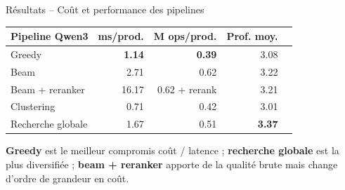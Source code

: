 \documentclass[11pt,aspectratio=169]{beamer}
\begin{document}
\begin{frame}{Résultats -- Coût et performance des pipelines}
\small
\begin{table}
\centering
\renewcommand{\arraystretch}{1.15}
\begin{tabular}{lrrrr}
\toprule
\textbf{Pipeline Qwen3} & \textbf{ms/prod.} & \textbf{M ops/prod.} & \textbf{Prof. moy.} \\
\midrule
Greedy & \textbf{1.14} & \textbf{0.39} & 3.08  \\
Beam & 2.71 & 0.62 & 3.22 \\
Beam + reranker & 16.17 & 0.62 + rerank & 3.21 \\
Clustering & 0.71 & 0.42 & 3.01  \\
Recherche globale & 1.67 & 0.51 & \textbf{3.37} \\
\bottomrule
\end{tabular}
\end{table}

\vspace{0.2cm}

\begin{takeawaybox}
\centering
\textbf{Greedy} est le meilleur compromis coût / latence ; \textbf{recherche globale} est la plus diversifiée ; \textbf{beam + reranker} apporte de la qualité brute mais change d'ordre de grandeur en coût.
\end{takeawaybox}
\end{frame}
\end{document}
